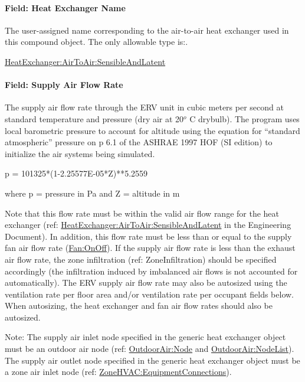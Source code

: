 \paragraph{Field: Heat Exchanger Name}\label{field-heat-exchanger-name-002}

The user-assigned name corresponding to the air-to-air heat exchanger used in this compound object. The only allowable type is:.

\hyperref[heatexchangerairtoairsensibleandlatent]{HeatExchanger:AirToAir:SensibleAndLatent}

\paragraph{Field: Supply Air Flow Rate}\label{field-supply-air-flow-rate-000}

The supply air flow rate through the ERV unit in cubic meters per second at standard temperature and pressure (dry air at 20\(^{o}\) \si{C} drybulb). The program uses local barometric pressure to account for altitude using the equation for ``standard atmospheric'' pressure on p 6.1 of the ASHRAE 1997 HOF (SI edition) to initialize the air systems being simulated.

p = 101325*(1-2.25577E-05*Z)**5.2559

where p = pressure in Pa and Z = altitude in m

Note that this flow rate must be within the valid air flow range for the heat exchanger (ref: \hyperref[heatexchangerairtoairsensibleandlatent]{HeatExchanger:AirToAir:SensibleAndLatent} in the Engineering Document). In addition, this flow rate must be less than or equal to the supply fan air flow rate (\hyperref[fanonoff]{Fan:OnOff}). If the supply air flow rate is less than the exhaust air flow rate, the zone infiltration (ref: ZoneInfiltration) should be specified accordingly (the infiltration induced by imbalanced air flows is not accounted for automatically). The ERV supply air flow rate may also be autosized using the ventilation rate per floor area and/or ventilation rate per occupant fields below. When autosizing, the heat exchanger and fan air flow rates should also be autosized.

Note: The supply air inlet node specified in the generic heat exchanger object must be an outdoor air node (ref: \hyperref[outdoorairnode]{OutdoorAir:Node} and \hyperref[outdoorairnodelist]{OutdoorAir:NodeList}). The supply air outlet node specified in the generic heat exchanger object must be a zone air inlet node (ref: \hyperref[zonehvacequipmentconnections]{ZoneHVAC:EquipmentConnections}).

